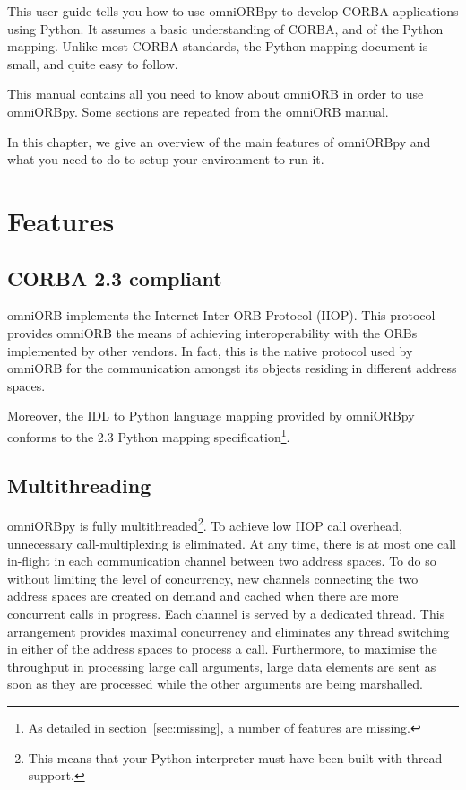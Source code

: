 \documentclass[11pt,twoside,a4paper]{book}
\begin{document}
This user guide tells you how to use omniORBpy to develop CORBA
applications using Python. It assumes a basic understanding of CORBA,
and of the Python mapping. Unlike most CORBA standards, the Python
mapping document is small, and quite easy to follow.

This manual contains all you need to know about omniORB in order to
use omniORBpy. Some sections are repeated from the omniORB manual.

In this chapter, we give an overview of the main features of omniORBpy
and what you need to do to setup your environment to run it.

\section{Features}

\subsection{CORBA 2.3 compliant}

omniORB implements the Internet Inter-ORB Protocol (IIOP).  This
protocol provides omniORB the means of achieving interoperability with
the ORBs implemented by other vendors. In fact, this is the native
protocol used by omniORB for the communication amongst its objects
residing in different address spaces.

Moreover, the IDL to Python language mapping provided by omniORBpy
conforms to the 2.3 Python mapping specification\footnote{As detailed
in section~\ref{sec:missing}, a number of features are missing.}.


\subsection{Multithreading}

omniORBpy is fully multithreaded\footnote{This means that your Python
interpreter must have been built with thread support.}. To achieve low
IIOP call overhead, unnecessary call-multiplexing is eliminated. At
any time, there is at most one call in-flight in each communication
channel between two address spaces. To do so without limiting the
level of concurrency, new channels connecting the two address spaces
are created on demand and cached when there are more concurrent calls
in progress. Each channel is served by a dedicated thread. This
arrangement provides maximal concurrency and eliminates any thread
switching in either of the address spaces to process a
call. Furthermore, to maximise the throughput in processing large call
arguments, large data elements are sent as soon as they are processed
while the other arguments are being marshalled.
\end{document}
